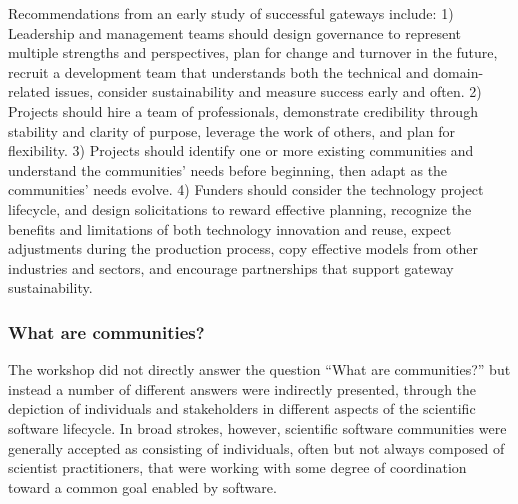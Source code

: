 \documentclass[11pt, oneside]{amsart}
\begin{document}
Recommendations from an early study of successful gateways include: 1)
Leadership and management teams should design governance to represent
multiple strengths and perspectives, plan for change and turnover in
the future, recruit a development team that understands both the
technical and domain-related issues, consider sustainability and
measure success early and often. 2) Projects should hire a team of
professionals, demonstrate credibility through stability and clarity
of purpose, leverage the work of others, and plan for flexibility. 3)
Projects should identify one or more existing communities and understand the
communities' needs before beginning, then adapt as the communities'
needs evolve. 4) Funders should consider the technology project
lifecycle, and design solicitations to reward effective planning,
recognize the benefits and limitations of both technology innovation
and reuse, expect adjustments during the production process, copy
effective models from other industries and sectors, and encourage
partnerships that support gateway sustainability.


\subsubsection{What are communities?}

The workshop did not directly answer the question ``What are
communities?'' but instead a number of different answers were
indirectly presented, through the depiction of individuals and
stakeholders in different aspects of the scientific software
lifecycle.  In broad strokes, however, scientific software communities
were generally accepted as consisting of individuals, often but not
always composed of scientist practitioners, that were working with
some degree of coordination toward a common goal enabled by software.
\end{document}

